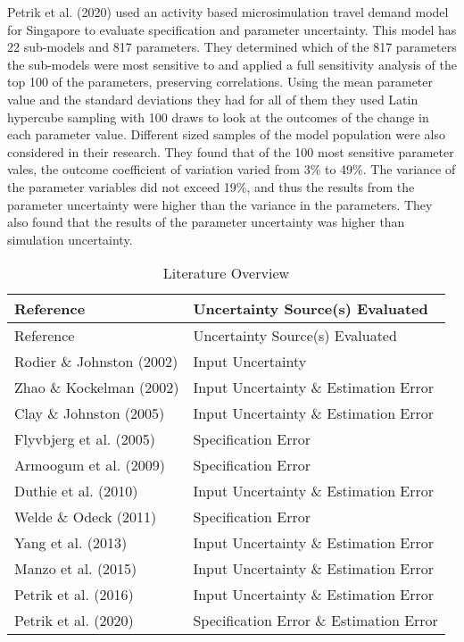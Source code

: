 \documentclass[fancy, masters,twoside]{byuthesis}
\begin{document}
Petrik et al. (2020) used an activity based microsimulation travel demand model for Singapore to evaluate specification and parameter uncertainty. This model has 22 sub-models and 817 parameters. They determined which of the 817 parameters the sub-models were most sensitive to and applied a full sensitivity analysis of the top 100 of the parameters, preserving correlations. Using the mean parameter value and the standard deviations they had for all of them they used Latin hypercube sampling with 100 draws to look at the outcomes of the change in each parameter value. Different sized samples of the model population were also considered in their research. They found that of the 100 most sensitive parameter vales, the outcome coefficient of variation varied from 3\% to 49\%. The variance of the parameter variables did not exceed 19\%, and thus the results from the parameter uncertainty were higher than the variance in the parameters. They also found that the results of the parameter uncertainty was higher than simulation uncertainty.

\begin{longtable}[]{@{}ll@{}}
\caption{\label{tab:authors}Literature Overview}\tabularnewline
\toprule()
Reference & Uncertainty Source(s) Evaluated \\
\midrule()
\endfirsthead
\toprule()
Reference & Uncertainty Source(s) Evaluated \\
\midrule()
\endhead
Rodier \& Johnston (2002) & Input Uncertainty \\
Zhao \& Kockelman (2002) & Input Uncertainty \& Estimation Error \\
Clay \& Johnston (2005) & Input Uncertainty \& Estimation Error \\
Flyvbjerg et al. (2005) & Specification Error \\
Armoogum et al. (2009) & Specification Error \\
Duthie et al. (2010) & Input Uncertainty \& Estimation Error \\
Welde \& Odeck (2011) & Specification Error \\
Yang et al. (2013) & Input Uncertainty \& Estimation Error \\
Manzo et al. (2015) & Input Uncertainty \& Estimation Error \\
Petrik et al. (2016) & Input Uncertainty \& Estimation Error \\
Petrik et al. (2020) & Specification Error \& Estimation Error \\
\bottomrule()
\end{longtable}
\end{document}
